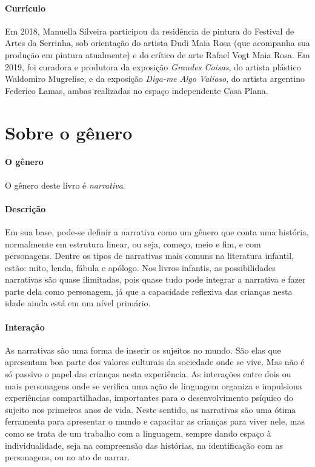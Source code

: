 \documentclass[11pt]{extarticle}
\begin{document}
\paragraph{Currículo} 
Em 2018, Manuella Silveira participou da residência de pintura do Festival de Artes da Serrinha, sob orientação do artista Dudi Maia Rosa (que acompanha sua produção em pintura atualmente) e do crítico de arte Rafael Vogt Maia Rosa. Em 2019, foi curadora e produtora da exposição \textit{Grandes Coisas}, do artista plástico Waldomiro Mugrelise, e da exposição \textit{Diga-me Algo Valioso}, do artista argentino Federico Lamas, ambas realizadas no espaço independente Casa Plana.


\section{Sobre o gênero}

\paragraph{O gênero} O gênero deste livro é \textit{narrativa}. 


\paragraph{Descrição} Em sua base, pode-se definir a narrativa como um gênero que conta uma história, normalmente em estrutura linear, ou seja, começo, meio e fim, e com personagens. 
Dentre os tipos de narrativas mais comuns na literatura infantil, estão: mito, lenda, 
fábula e apólogo. Nos livros infantis, as possibilidades narrativas são quase ilimitadas, pois quase tudo pode integrar a narrativa e fazer parte dela como personagem, já que a capacidade reflexiva das crianças nesta idade ainda está em um nível primário. 


\paragraph{Interação} As narrativas são uma forma de inserir os sujeitos no mundo. 
São elas que apresentam boa parte dos valores culturais da sociedade 
onde se vive. Mas não é só passivo o papel das crianças nesta experiência. 
As interações entre dois ou mais personagens onde se verifica
uma ação de linguagem organiza e impulsiona experiências compartilhadas,
importantes para o desenvolvimento psíquico do sujeito nos primeiros anos de vida.
Neste sentido, as narrativas são uma ótima ferramenta para
apresentar o mundo e capacitar as crianças para viver nele, mas como se
trata de um trabalho com a linguagem, sempre dando espaço à individualidade, 
seja na compreensão das histórias, na identificação com as personagens, ou 
no ato de narrar.
\end{document}
